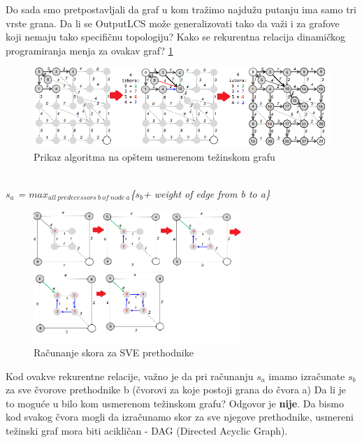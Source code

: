 Do sada smo pretpostavljali da graf u kom tražimo najdužu putanju ima samo tri vrste grana. Da li se OutputLCS može generalizovati tako da važi i za grafove koji nemaju tako specifičnu
topologiju? Kako se rekurentna relacija dinamičkog programiranja menja za ovakav graf? \ref{slika:rekRel}
\begin{figure}[h]
\centering
\includegraphics[width=\textwidth]{poglavlja/5/slike/rekurentaRelDinProg.png}
\caption{Prikaz algoritma na opštem usmerenom težinskom grafu}
\label{slika:rekRel}
\end{figure}
\\

\noindent\textit{$s_a$ = $max_{all\ predecessors\ b\ of\ node\ a}$\{$s_b$+ weight of edge from b to a\}}


\begin{figure}[h]
\centering
\includegraphics[width=0.7\textwidth]{poglavlja/5/slike/racunanje.png}
\caption{Računanje skora za SVE prethodnike}
\label{slika:racunanje}
\end{figure}


Kod ovakve rekurentne relacije, važno je da pri računanju $s_a$ imamo izračunate $s_b$ za sve čvorove prethodnike b (čvorovi za koje postoji grana do čvora a) Da li je to moguće u bilo kom usmerenom težinskom grafu? Odgovor je \textbf{nije}. Da bismo kod svakog čvora mogli da izračunamo skor za sve njegove prethodnike, usmereni težinski graf mora biti acikličan - DAG (Directed Acyclic Graph). 

